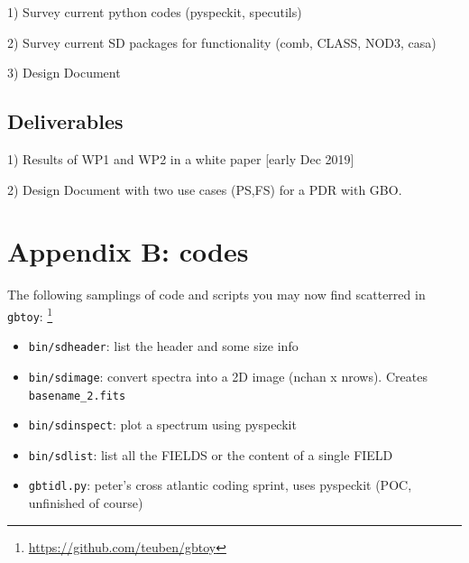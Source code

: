 \documentclass[12pt,a4paper]{article}
\begin{document}
1) Survey current python codes (pyspeckit, specutils)

2) Survey current SD packages for functionality (comb, CLASS, NOD3, casa)

3) Design Document

\subsection{Deliverables}

1) Results of WP1 and WP2 in a white paper [early Dec 2019]

2) Design Document with two use cases (PS,FS) for a PDR with GBO.

\section*{Appendix B: codes}

The following samplings of code and scripts you may now find scatterred in {\tt gbtoy}:
\footnote{\url{https://github.com/teuben/gbtoy}}

\begin{itemize}
  \item {\tt bin/sdheader}:  list the header and some size info
  \item {\tt bin/sdimage}:    convert spectra into a 2D image (nchan x nrows). Creates {\tt basename\_2.fits}
  \item {\tt bin/sdinspect}:  plot a spectrum using pyspeckit
  \item {\tt bin/sdlist}:  list all the FIELDS or the content of a single FIELD
  \item {\tt gbtidl.py}: peter's cross atlantic coding sprint, uses pyspeckit (POC, unfinished of course)
\end{itemize}       
\end{document}
